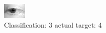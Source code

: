 \begin{figure}[h!]
\begin{center}
\includegraphics[width=0.60\columnwidth]{figures/ID2626_class_3_target_4.png}
\end{center}
\caption{ Classification: 3 actual target: 4}
\label{fig:ID2626_class_3_target_4}
\end{figure}
